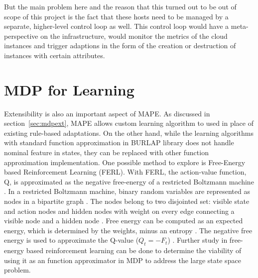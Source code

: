 \documentclass{seal_thesis}
\begin{document}
But the main problem here and the reason that this turned out to be out of scope of this project is the fact that these hosts need to be managed by a separate, higher-level control loop as well.
This control loop would have a meta-perspective on the infrastructure, would monitor the metrics of the cloud instances and trigger adaptions in the form of the creation or destruction of instances with certain attributes.

\section{MDP for Learning}
Extensibility is also an important aspect of MAPE.
As discussed in section~\ref{sec:mdpext}, MAPE allows custom learning algorithm to used in place of existing rule-based adaptations.
On the other hand, while the learning algorithms with standard function approximation in BURLAP library does not handle nominal feature in states, they can be replaced with other function approximation implementation.
One possible method to explore is Free-Energy based Reinforcement Learning (FERL).
With FERL, the action-value function, Q, is approximated as the negative free-energy of a restricted Boltzmann machine \cite{sallans2004reinforcement}.
In a restricted Boltzmann machine, binary random variables are represented as nodes in a bipartite graph \cite{sallans2004reinforcement}.
The nodes belong to two disjointed set: visible state and action nodes and hidden nodes with weight on every edge connecting a visible node and a hidden node \cite{sallans2004reinforcement, 10.3389/fnbot.2013.00003}.
Free energy can be computed as an expected energy, which is determined by the weights, minus an entropy \cite{sallans2004reinforcement}.
The negative free energy is used to approximate the Q-value ($Q_t = -F_t$) \cite{sallans2004reinforcement, 10.3389/fnbot.2013.00003}.
Further study in free-energy based reinforcement learning can be done to determine the viability of using it as an function approximator in MDP to address the large state space problem.


\end{document}
